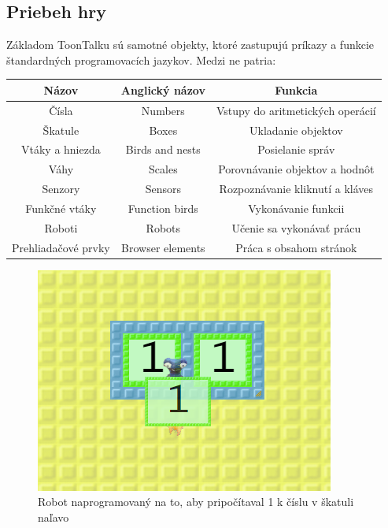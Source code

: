 \documentclass[slovak,a4paper,10pt]{article}
\begin{document}
\subsection{Priebeh hry}
Základom ToonTalku sú samotné objekty, ktoré zastupujú príkazy a funkcie štandardných programovacích jazykov. Medzi ne patria:
\begin{center}
\begin{tabular}{|c|c|c|}
\hline
Názov & Anglický názov & Funkcia \\
\hline
Čísla & Numbers & Vstupy do aritmetických operácií \\
\hline
Škatule & Boxes & Ukladanie objektov \\
\hline
Vtáky a hniezda & Birds and nests & Posielanie správ \\
\hline
Váhy & Scales & Porovnávanie objektov a hodnôt \\
\hline
Senzory & Sensors & Rozpoznávanie kliknutí a kláves \\
\hline
Funkčné vtáky & Function birds & Vykonávanie funkcii \\
\hline
Roboti & Robots & Učenie sa vykonávať prácu \\
\hline
Prehliadačové prvky & Browser elements & Práca s obsahom stránok \\
\hline
\end{tabular}
\end{center}
\begin{figure}[h]
\includegraphics[scale=0.5]{toontalkrobot}
\centering
\caption{Robot naprogramovaný na to, aby pripočítaval 1 k číslu v škatuli naľavo}
\label{fig:obr2}
\end{figure}

\end{document}
